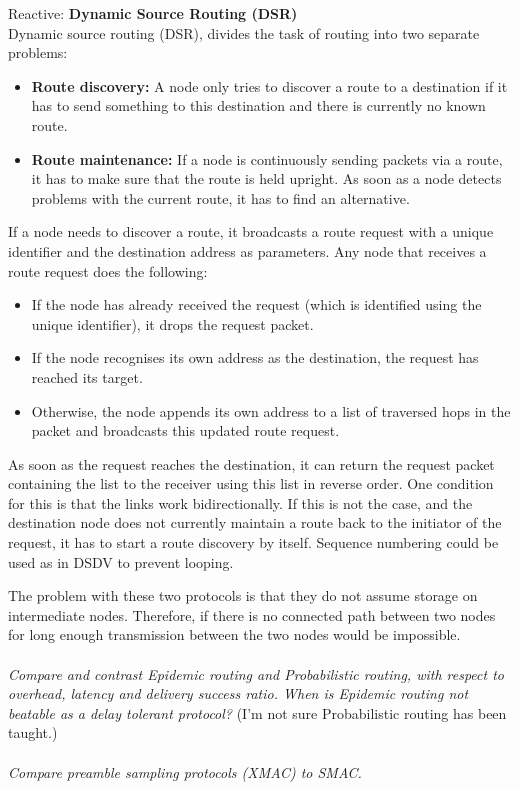 \documentclass[12pt]{article}
\newcommand*\circled[1]{\tikz[baseline=(char.base)]{
		\node[shape=circle,draw,inner sep=0pt] (char) {#1};}}
\begin{document}
Reactive: \textbf{Dynamic Source Routing (DSR)}\\
Dynamic source routing (DSR), divides the task of routing into two
separate problems:
\begin{itemize}
    \item \textbf{Route discovery:} A node only tries to discover a route to
        a destination if it has to send something to this destination and there
        is currently no known route.
    \item \textbf{Route maintenance:} If a node is continuously sending packets
        via a route, it has to make sure that the route is held upright. As
        soon as a node detects problems with the current route, it has to find
        an alternative.
\end{itemize}
If a node needs to discover a route, it broadcasts a route request with
a unique identifier and the destination address as parameters. Any node that
receives a route request does the following:
\begin{itemize}
    \item If the node has already received the request (which is identified
        using the unique identifier), it drops the request packet.
    \item If the node recognises its own address as the destination, the request
        has reached its target.
    \item Otherwise, the node appends its own address to a list of traversed
        hops in the packet and broadcasts this updated route request.
\end{itemize}
As soon as the request reaches the destination, it can return the request packet
containing the list to the receiver using this list in reverse order. One
condition for this is that the links work bidirectionally. If this is not the
case, and the destination node does not currently maintain a route back to the
initiator of the request, it has to start a route discovery by itself. Sequence
numbering could be used as in DSDV to prevent looping.

The problem with these two protocols is that they do not assume storage on
intermediate nodes. Therefore, if there is no connected path between two nodes
for long enough transmission between the two nodes would be impossible.
\\
\\
\textit{\circled{6.} Compare and contrast Epidemic routing and Probabilistic
routing, with respect to overhead, latency and delivery success ratio. When is
Epidemic routing not beatable as a delay tolerant protocol?}
(I'm not sure Probabilistic routing has been taught.)
\\
\\
\textit{\circled{7.} Compare preamble sampling protocols (XMAC) to SMAC.}
\end{document}
